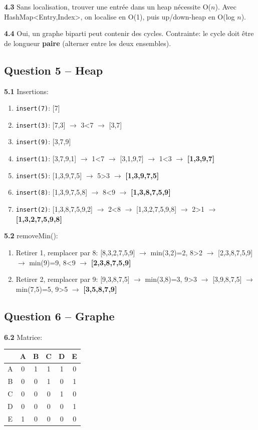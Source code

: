 \documentclass[11pt,letterpaper]{article}
\begin{document}
\textbf{4.3} Sans localisation, trouver une entrée dans un heap nécessite O($n$). Avec HashMap<Entry,Index>, on localise en O(1), puis up/down-heap en O(log $n$).

\textbf{4.4} Oui, un graphe biparti peut contenir des cycles. Contrainte: le cycle doit être de longueur \textbf{paire} (alterner entre les deux ensembles).

\subsection*{Question 5 -- Heap}

\textbf{5.1} Insertions:
\begin{enumerate}
    \item \texttt{insert(7)}: [7]
    \item \texttt{insert(3)}: [7,3] $\to$ 3<7 $\to$ [3,7]
    \item \texttt{insert(9)}: [3,7,9]
    \item \texttt{insert(1)}: [3,7,9,1] $\to$ 1<7 $\to$ [3,1,9,7] $\to$ 1<3 $\to$ \textbf{[1,3,9,7]}
    \item \texttt{insert(5)}: [1,3,9,7,5] $\to$ 5>3 $\to$ \textbf{[1,3,9,7,5]}
    \item \texttt{insert(8)}: [1,3,9,7,5,8] $\to$ 8<9 $\to$ \textbf{[1,3,8,7,5,9]}
    \item \texttt{insert(2)}: [1,3,8,7,5,9,2] $\to$ 2<8 $\to$ [1,3,2,7,5,9,8] $\to$ 2>1 $\to$ \textbf{[1,3,2,7,5,9,8]}
\end{enumerate}

\textbf{5.2} removeMin():
\begin{enumerate}
    \item Retirer 1, remplacer par 8: [8,3,2,7,5,9] $\to$ min(3,2)=2, 8>2 $\to$ [2,3,8,7,5,9] $\to$ min(9)=9, 8<9 $\to$ \textbf{[2,3,8,7,5,9]}
    \item Retirer 2, remplacer par 9: [9,3,8,7,5] $\to$ min(3,8)=3, 9>3 $\to$ [3,9,8,7,5] $\to$ min(7,5)=5, 9>5 $\to$ \textbf{[3,5,8,7,9]}
\end{enumerate}

\subsection*{Question 6 -- Graphe}

\textbf{6.2} Matrice:
\begin{center}
\begin{tabular}{c|ccccc}
  & A & B & C & D & E \\
\hline
A & 0 & 1 & 1 & 1 & 0 \\
B & 0 & 0 & 1 & 0 & 1 \\
C & 0 & 0 & 0 & 1 & 0 \\
D & 0 & 0 & 0 & 0 & 1 \\
E & 1 & 0 & 0 & 0 & 0 \\
\end{tabular}
\end{center}
\end{document}
